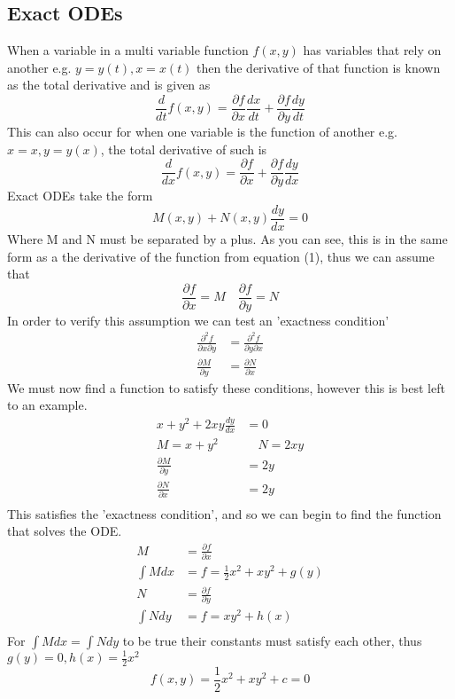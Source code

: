 \documentclass{article}
\begin{document}
\subsection{Exact ODEs}
When a variable in a multi variable function $f(x,y)$ has variables that rely on another e.g. 
$y = y(t), x = x(t)$ then the derivative of that function is known as the total derivative and
 is given as $$\frac{d}{dt}f(x,y) = \frac{\partial f}{\partial x} \frac{dx}{dt} + \frac{\partial f}{\partial y} \frac{dy}{dt}$$
 This can also occur for when one variable is the function of another e.g. $x = x, y = y(x)$, the total derivative of such is 
\begin{equation}
\label{eqn:Total Derivative}
\frac{d}{dx}f(x,y) = \frac{\partial f}{\partial x} + \frac{\partial f}{\partial y} \frac{dy}{dx}
\end{equation}
Exact ODEs take the form $$M(x,y) + N(x,y)\frac{dy}{dx}=0$$
Where M and N must be separated by a plus. 
As you can see, this is in the same form as a the derivative of the function from equation (1),
 thus we can assume that $$\frac{\partial f}{\partial x} = M \quad \frac{\partial f}{\partial y} = N$$
In order to verify this assumption we can test an 'exactness condition' 
\begin{align*}
    \frac{\partial^2f}{\partial x \partial y} &= \frac{\partial^2 f}{\partial y \partial x}\\
    \frac{\partial M}{\partial y} &= \frac{\partial N}{\partial x}
\end{align*}
We must now find a function to satisfy these conditions, however this is best left to an example.
\newpage
\begin{align*}
     x + y^2 + 2xy\frac{dy}{dx} &= 0\\
     M = x + y^2 & \quad N = 2xy\\
     \frac{\partial M}{\partial y} &= 2y\\
     \frac{\partial N}{\partial x} &= 2y\\
\end{align*}
This satisfies the 'exactness condition', and so we can begin to find the function that solves the ODE.
\begin{align*}
    M &= \frac{\partial f}{\partial x}\\
    \int M dx &= f = \frac{1}{2}x^2 + xy^2 + g(y)\\
    N &= \frac{\partial f}{\partial y}\\
    \int N dy &= f = xy^2 + h(x)\\
\end{align*}
For $\int M dx = \int N dy$ to be true their constants must satisfy each other, thus $g(y) = 0, h(x) = \frac{1}{2}x^2$
$$f(x,y) = \frac{1}{2}x^2 + xy^2 + c = 0$$
\end{document}
